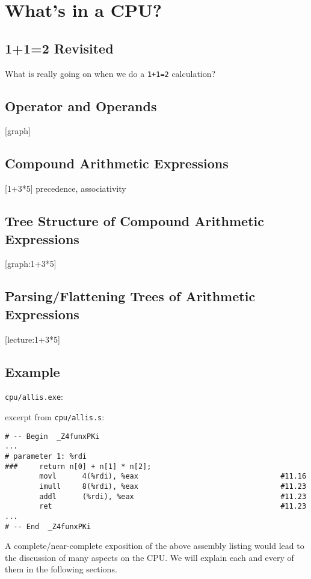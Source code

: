 \documentclass[main]{subfiles}
\begin{document}
\section{What's in a CPU?}
\subsection{1+1=2 Revisited}
What is really going on when we do a \texttt{1+1=2} calculation?

\subsection{Operator and Operands}
[graph]
\subsection{Compound Arithmetic Expressions}
[1+3*5]
precedence, associativity
\subsection{Tree Structure of Compound Arithmetic Expressions}
[graph:1+3*5]
\subsection{Parsing/Flattening Trees of Arithmetic Expressions}
[lecture:1+3*5] 
\subsection{Example}
\texttt{cpu/allis.exe}:


excerpt from \texttt{cpu/allis.s}:
\begin{lstlisting}[language=Ant]
# -- Begin  _Z4funxPKi
...
# parameter 1: %rdi
### 	return n[0] + n[1] * n[2];
        movl      4(%rdi), %eax                                 #11.16
        imull     8(%rdi), %eax                                 #11.23
        addl      (%rdi), %eax                                  #11.23
        ret                                                     #11.23
...
# -- End  _Z4funxPKi
\end{lstlisting}

A complete/near-complete exposition of the above assembly listing would lead to
the discussion of many aspects on the CPU. We will explain each and every of
them in the following sections.
\end{document}
